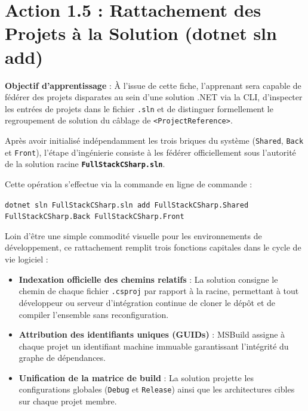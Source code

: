 \section{Action 1.5 : Rattachement des Projets à la Solution (dotnet sln add)}

\begin{tcolorbox}[colback=indigo!4!white,colframe=indigo!40!white,arc=2mm,boxrule=0.8pt,top=2mm,bottom=2mm,left=3mm,right=3mm]
    \small\textbf{\color{indigo!90!black}Objectif d'apprentissage} : À l'issue de cette fiche, l'apprenant sera capable de fédérer des projets disparates au sein d'une solution .NET via la CLI, d'inspecter les entrées de projets dans le fichier \texttt{.sln} et de distinguer formellement le regroupement de solution du câblage de \texttt{<ProjectReference>}.
\end{tcolorbox}

\vspace{0.1cm}

Après avoir initialisé indépendamment les trois briques du système (\texttt{Shared}, \texttt{Back} et \texttt{Front}), l'étape d'ingénierie consiste à les fédérer officiellement sous l'autorité de la solution racine \textbf{\texttt{FullStackCSharp.sln}}.

Cette opération s'effectue via la commande en ligne de commande :
\begin{center}
\texttt{dotnet sln FullStackCSharp.sln add FullStackCSharp.Shared FullStackCSharp.Back FullStackCSharp.Front}
\end{center}

Loin d'être une simple commodité visuelle pour les environnements de développement, ce rattachement remplit trois fonctions capitales dans le cycle de vie logiciel :
\begin{itemize}
    \item \textbf{Indexation officielle des chemins relatifs} : La solution consigne le chemin de chaque fichier \texttt{.csproj} par rapport à la racine, permettant à tout développeur ou serveur d'intégration continue de cloner le dépôt et de compiler l'ensemble sans reconfiguration.
    \item \textbf{Attribution des identifiants uniques (GUIDs)} : MSBuild assigne à chaque projet un identifiant machine immuable garantissant l'intégrité du graphe de dépendances.
    \item \textbf{Unification de la matrice de build} : La solution projette les configurations globales (\texttt{Debug} et \texttt{Release}) ainsi que les architectures cibles sur chaque projet membre.
\end{itemize}

